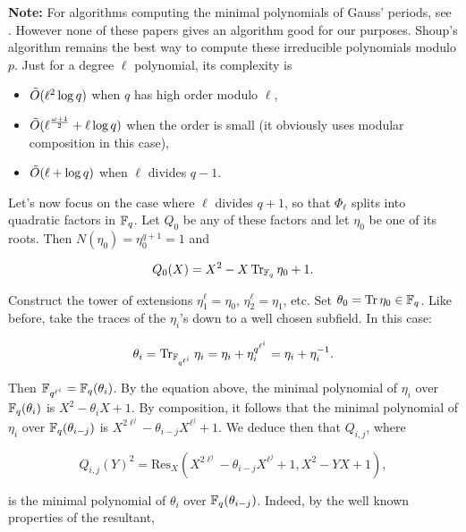 \documentclass[11pt]{article}
\begin{document}
\textbf{Note:} For algorithms computing the minimal polynomials of
Gauss' periods, see
\cite{gupta+zagier93,gurak06powers,gurak06,thaine01,thaine00}.
However none of these papers gives an algorithm good for our
purposes. Shoup's algorithm \cite{shoup94} remains the best way to
compute these irreducible polynomials modulo $p$. Just for a degree
$\ell$ polynomial, its complexity is

\begin{itemize}
\item $\tilde{O}(\ell^2\log q)$ when $q$ has high order modulo $\ell$,
\item $\tilde{O}(\ell^{\frac{\omega+1}{2}} + \ell\log q)$ when the order
  is small (it obviously uses modular composition in this case),
\item $\tilde{O}(\ell + \log q)$ when $\ell$ divides $q-1$.
\end{itemize}
Let's now focus on the case where $\ell$ divides $q+1$, so that
$\Phi_\ell$ splits into quadratic factors in $\mathbb{F}_q$. Let $Q_0$ be any
of these factors and let $\eta_0$ be one of its roots. Then
$N(\eta_0)=\eta_0^{q+1}=1$ and

\begin{equation}
  Q_0(X) = X^2 - X\operatorname{Tr}_{\mathbb{F}_q}\eta_0 + 1.
\end{equation}

Construct the tower of extensions $\eta_1^\ell=\eta_0$,
$\eta_2^\ell=\eta_1$, etc.  Set $\theta_0 = \operatorname{Tr}\eta_0 \in \mathbb{F}_q$.  Like
before, take the traces of the $\eta_i$'s down to a well chosen
subfield. In this case:

\begin{equation}
  \theta_i = \operatorname{Tr}_{\mathbb{F}_{q^{\ell^i}}}\eta_i = \eta_i + \eta_i^{q^{\ell^i}} = \eta_i + \eta_i^{-1}.
\end{equation}
    
Then $\mathbb{F}_{q^{\ell^i}} = \mathbb{F}_q(\theta_i)$. By the equation above, the
minimal polynomial of $\eta_i$ over $\mathbb{F}_q(\theta_i)$ is $X^2
-\theta_iX+1$. By composition, it follows that the minimal polynomial
of $\eta_i$ over $\mathbb{F}_q(\theta_{i-j})$ is
$X^{2\ell^j}-\theta_{i-j}X^{\ell^j}+1$. We deduce then that $Q_{i,j}$,
where

\begin{equation}
  Q_{i,j}(Y)^2 = \mathrm{Res}_X(X^{2\ell^j}-\theta_{i-j}X^{\ell^j}+1, X^2-YX+1),
\end{equation}

is the minimal polynomial of $\theta_i$ over
$\mathbb{F}_q(\theta_{i-j})$. Indeed, by the well known properties of the
resultant,
\end{document}
